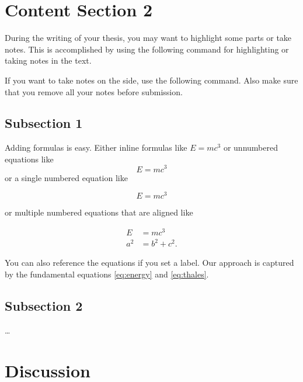 \chapter{Content Section 2}
\label{ch:section2}

During the writing of your thesis, you may want to highlight some parts or take notes. This is accomplished by using the following command for highlighting or taking notes in the text. 


If you want to take notes on the side, use the following command. Also make sure that you remove all your notes before submission.



\section{Subsection 1}
\label{ch:section2:sec:subsection1}
Adding formulas is easy. Either inline formulas like $E=mc^3$ or unnumbered equations like $$E=mc^3$$ or a single numbered equation like 

\begin{equation}
E=mc^3
\end{equation}

or multiple numbered equations that are aligned like

\begin{align}
E &=mc^3\label{eq:energy}\\
a^2 &=b^2 + c^2\label{eq:thales}.
\end{align}

You can also reference the equations if you set a label. Our approach is captured by the fundamental equations \eqref{eq:energy} and \eqref{eq:thales}.


\section{Subsection 2}
\label{ch:section2:sec:subsection2}

\dots 



\chapter{Discussion}
\label{ch:Discussion}

